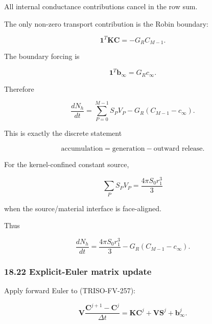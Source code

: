 \documentclass[11pt,a4paper]{article}
\begin{document}
All internal conductance contributions cancel in the row sum.

The only non-zero transport contribution is the Robin boundary:

\begin{equation}
\mathbf1^T\mathbf K\mathbf C
=
-G_RC_{M-1}.
\tag{TRISO-FV-283}
\label{eq:triso-fv-283}
\end{equation}

The boundary forcing is

\begin{equation}
\mathbf1^T\mathbf b_\infty
=
G_Rc_\infty.
\tag{TRISO-FV-284}
\label{eq:triso-fv-284}
\end{equation}

Therefore

\begin{equation}
\boxed{
\frac{dN_h}{dt}
=
\sum_{P=0}^{M-1}S_PV_P
-
G_R(C_{M-1}-c_\infty).
}
\tag{TRISO-FV-285}
\label{eq:triso-fv-285}
\end{equation}

This is exactly the discrete statement

\begin{equation}
\text{accumulation}
=
\text{generation}
-
\text{outward release}.
\tag{TRISO-FV-286}
\label{eq:triso-fv-286}
\end{equation}

For the kernel-confined constant source,

\begin{equation}
\sum_PS_PV_P
=
\frac{4\pi S_0r_1^3}{3}
\tag{TRISO-FV-287}
\label{eq:triso-fv-287}
\end{equation}

when the source/material interface is face-aligned.

Thus

\begin{equation}
\boxed{
\frac{dN_h}{dt}
=
\frac{4\pi S_0r_1^3}{3}
-
G_R(C_{M-1}-c_\infty).
}
\tag{TRISO-FV-288}
\label{eq:triso-fv-288}
\end{equation}

\subsubsection*{18.22 Explicit-Euler matrix update}

Apply forward Euler to (TRISO-FV-257):

\begin{equation}
\mathbf V
\frac{
\mathbf C^{j+1}-\mathbf C^j
}{
\Delta t
}
=
\mathbf K\mathbf C^j
+
\mathbf V\mathbf S^j
+
\mathbf b_\infty^j.
\tag{TRISO-FV-289}
\label{eq:triso-fv-289}
\end{equation}
\end{document}
